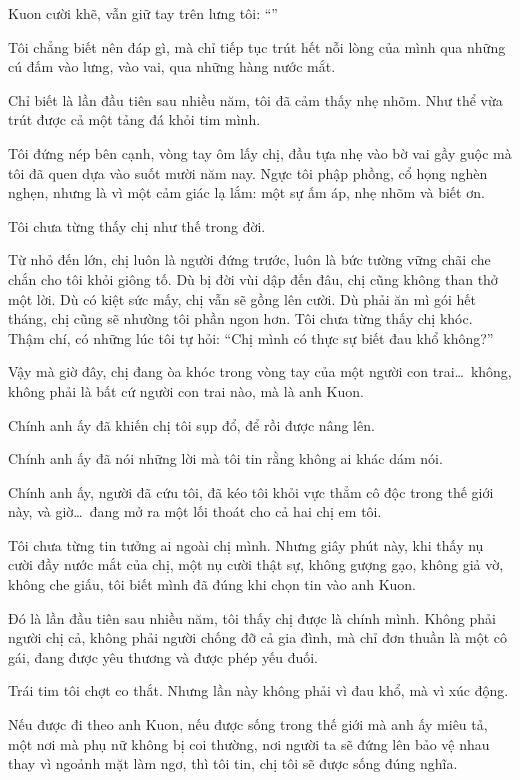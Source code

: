 \documentclass[../main.tex]{subfiles}
\begin{document}
Kuon cười khẽ, vẫn giữ tay trên lưng tôi: ``''

Tôi chẳng biết nên đáp gì, mà chỉ tiếp tục trút hết nỗi lòng của mình qua những cú đấm vào lưng, vào vai, qua những hàng nước mắt.

Chỉ biết là lần đầu tiên sau nhiều năm, tôi đã cảm thấy nhẹ nhõm. Như thể vừa trút được cả một tảng đá khỏi tim mình.


Tôi đứng nép bên cạnh, vòng tay ôm lấy chị, đầu tựa nhẹ vào bờ vai gầy guộc mà tôi đã quen dựa vào suốt mười năm nay. Ngực tôi phập phồng, cổ họng nghèn nghẹn, nhưng là vì một cảm giác lạ lắm: một sự ấm áp, nhẹ nhõm và biết ơn.

Tôi chưa từng thấy chị như thế trong đời.

Từ nhỏ đến lớn, chị luôn là người đứng trước, luôn là bức tường vững chãi che chắn cho tôi khỏi giông tố. Dù bị đời vùi dập đến đâu, chị cũng không than thở một lời. Dù có kiệt sức mấy, chị vẫn sẽ gồng lên cười. Dù phải ăn mì gói hết tháng, chị cũng sẽ nhường tôi phần ngon hơn. Tôi chưa từng thấy chị khóc. Thậm chí, có những lúc tôi tự hỏi: ``Chị mình có thực sự biết đau khổ không?''

Vậy mà giờ đây, chị đang òa khóc trong vòng tay của một người con trai\dots\ không, không phải là bất cứ người con trai nào, mà là anh Kuon.

Chính anh ấy đã khiến chị tôi sụp đổ, để rồi được nâng lên.

Chính anh ấy đã nói những lời mà tôi tin rằng không ai khác dám nói.

Chính anh ấy, người đã cứu tôi, đã kéo tôi khỏi vực thẳm cô độc trong thế giới này, và giờ\dots\ đang mở ra một lối thoát cho cả hai chị em tôi.

Tôi chưa từng tin tưởng ai ngoài chị mình. Nhưng giây phút này, khi thấy nụ cười đầy nước mắt của chị, một nụ cười thật sự, không gượng gạo, không giả vờ, không che giấu, tôi biết mình đã đúng khi chọn tin vào anh Kuon.

Đó là lần đầu tiên sau nhiều năm, tôi thấy chị được là chính mình. Không phải người chị cả, không phải người chống đỡ cả gia đình, mà chỉ đơn thuần là một cô gái, đang được yêu thương và được phép yếu đuối.

Trái tim tôi chợt co thắt. Nhưng lần này không phải vì đau khổ, mà vì xúc động.

Nếu được đi theo anh Kuon, nếu được sống trong thế giới mà anh ấy miêu tả, một nơi mà phụ nữ không bị coi thường, nơi người ta sẽ đứng lên bảo vệ nhau thay vì ngoảnh mặt làm ngơ, thì tôi tin, chị tôi sẽ được sống đúng nghĩa.
\end{document}
